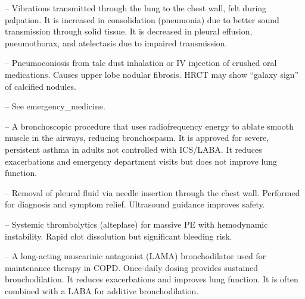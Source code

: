 -- Vibrations transmitted through the lung to the chest wall, felt during palpation. It is increased in consolidation (pneumonia) due to better sound transmission through solid tissue. It is decreased in pleural effusion, pneumothorax, and atelectasis due to impaired transmission.

-- Pneumoconiosis from talc dust inhalation or IV injection of crushed oral medications. Causes upper lobe nodular fibrosis. HRCT may show ``galaxy sign'' of calcified nodules.

-- See emergency\_medicine.


-- A bronchoscopic procedure that uses radiofrequency energy to ablate smooth muscle in the airways, reducing bronchospasm. It is approved for severe, persistent asthma in adults not controlled with ICS/LABA. It reduces exacerbations and emergency department visits but does not improve lung function.

-- Removal of pleural fluid via needle insertion through the chest wall. Performed for diagnosis and symptom relief. Ultrasound guidance improves safety.

-- Systemic thrombolytics (alteplase) for massive PE with hemodynamic instability. Rapid clot dissolution but significant bleeding risk.

-- A long-acting muscarinic antagonist (LAMA) bronchodilator used for maintenance therapy in COPD. Once-daily dosing provides sustained bronchodilation. It reduces exacerbations and improves lung function. It is often combined with a LABA for additive bronchodilation.


